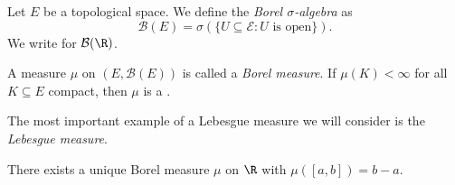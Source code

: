 \documentclass[a4paper]{article}
\begin{document}
\begin{defi}
  Let $E$ be a topological space. We define the \emph{Borel $\sigma$-algebra} as
  \[
    \mathcal{B}(E) = \sigma(\{U \subseteq \mathcal{E}: U \text{ is open}\}).
  \]
  We write  for $\mathcal{B}(\R)$.
\end{defi}

\begin{defi}
  A measure $\mu$ on $(E, \mathcal{B}(E))$  is called a \emph{Borel measure}. If $\mu(K) < \infty$ for all $K \subseteq E$ compact, then $\mu$ is a .
\end{defi}
The most important example of a Lebesgue measure we will consider is the \emph{Lebesgue measure}.

\begin{thm}
  There exists a unique Borel measure $\mu$ on $\R$ with $\mu([a, b]) = b - a$.
\end{thm}
\end{document}
